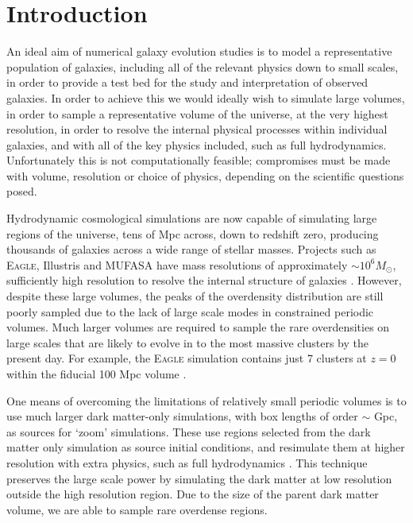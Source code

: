 
\section{Introduction}

An ideal aim of numerical galaxy evolution studies is to model a representative population of galaxies, including all of the relevant physics down to small scales, in order to provide a test bed for the study and interpretation of observed galaxies.
In order to achieve this we would ideally wish to simulate large volumes, in order to sample a representative volume of the universe, at the very highest resolution, in order to resolve the internal physical processes within individual galaxies, and with all of the key physics included, such as full hydrodynamics.
Unfortunately this is not computationally feasible; compromises must be made with volume, resolution or choice of physics, depending on the scientific questions posed.

Hydrodynamic cosmological simulations are now capable of simulating large regions of the universe, tens of Mpc across, down to redshift zero, producing thousands of galaxies across a wide range of stellar masses.
Projects such as \textsc{Eagle}, Illustris and MUFASA have mass resolutions of approximately $\sim 10^6 M_{\odot}$, sufficiently high resolution to resolve the internal structure of galaxies \citep{schaye_eagle_2014,vogelsberger_introducing_2014,dave_mufasa:_2016-1}.
However, despite these large volumes, the peaks of the overdensity distribution are still poorly sampled due to the lack of large scale modes in constrained periodic volumes.
Much larger volumes are required to sample the rare overdensities on large scales that are likely to evolve in to the most massive clusters by the present day.
For example, the \textsc{Eagle} simulation contains just 7 clusters  at $z=0$ within the fiducial 100 Mpc volume \citep{schaye_eagle_2014}.


One means of overcoming the limitations of relatively small periodic volumes is to use much larger dark matter-only simulations, with box lengths of order $\sim$ Gpc, as sources for `zoom' simulations.
These use regions selected from the dark matter only simulation as source initial conditions, and resimulate them at higher resolution with extra physics, such as full hydrodynamics \citep{katz_hierarchical_1993, tormen_structure_1997}.
This technique preserves the large scale power by simulating the dark matter at low resolution outside the high resolution region.
Due to the size of the parent dark matter volume, we are able to sample rare overdense regions.

